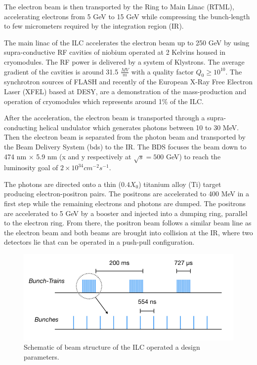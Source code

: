 The electron beam is then transported by the Ring to Main Linac (RTML), accelerating electrons from 5 GeV to 15 GeV while compressing the bunch-length to few micrometers required by the integration region (IR).

The main linac of the ILC accelerates the electron beam up to 250 GeV by using supra-conductive RF cavities of niobium operated at 2 Kelvins housed in cryomodules. The RF power is delivered by a system of Klystrons. The average gradient of the cavities is around 31.5 $\frac{MV}{m}$ with a quality factor $Q_0 \geqslant 10^{10}$. The synchrotron sources of FLASH and recently of the European X-Ray Free Electron Laser (XFEL) based at DESY, are a demonstration of the mass-production and operation of cryomodules which represents around 1\% of the ILC.

After the acceleration, the electron beam is transported through a supra-conducting helical undulator which generates photons between 10 to 30 MeV. Then the electron beam is separated from the photon beam and transported by the Beam Delivery System (\acrshort{bds}) to the IR. The BDS focuses the beam down to 474 nm $\times$ 5.9 nm (x and y respectively at $\sqrt{s} = 500$ GeV) to reach the luminosity goal of $2 \times 10^{34} cm^{-2}s^{-1}$.

The photons are directed onto a thin ($0.4 X_0$) titanium alloy (Ti) target producing elec\-tron\--positron pairs. The positrons are accelerated to 400 MeV in a first step while the remaining electrons and photons are dumped. The positrons are accelerated to 5 GeV by a booster and injected into a dumping ring, parallel to the electron ring. From there, the positron beam follows a similar beam line as the electron beam and both beams are brought into collision at the IR, where two detectors lie that can be operated in a push-pull configuration.

\begin{figure}[htbp!]
  \centering
  \includegraphics[width=0.7\linewidth]{chap2/fig/BeamStructure.jpeg}
  \caption{Schematic of beam structure of the ILC operated a design parameters.} \label{fig:ILC_BeamStruct}
\end{figure}

